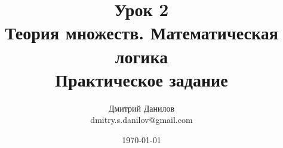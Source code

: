 \documentclass{report}
\begin{document}
\title{Урок 2 \\ Теория множеств. Математическая логика \\ Практическое задание}
\author{Дмитрий Данилов \\ dmitry.s.danilov@gmail.com}
\date{\today}
\maketitle


%


%
%
\end{document}
